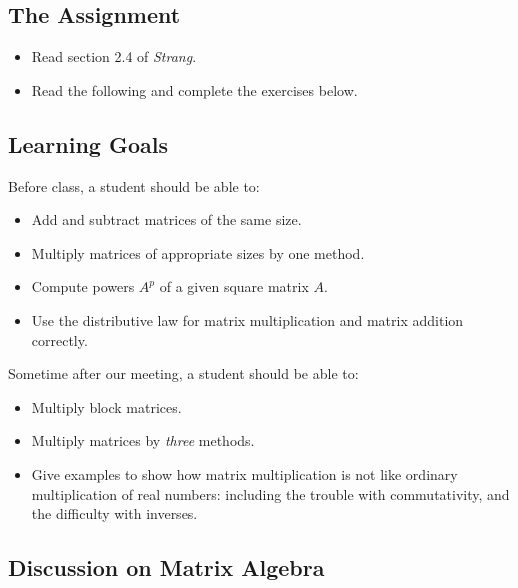 \documentclass[10pt,]{book}
\theoremstyle{plain}
\numberwithin{equation}{section}
\begin{document}
\subsection[The Assignment]{The Assignment}\label{subsection-36}
\begin{itemize}
\item{}Read section 2.4 of \emph{Strang}.\item{}Read the following and complete the exercises below.\end{itemize}
\typeout{************************************************}
\typeout{************************************************}
\subsection[Learning Goals]{Learning Goals}\label{subsection-37}

      Before class, a student should be able to:
\begin{itemize}
\item{}Add and subtract matrices of the same size.\item{}Multiply matrices of appropriate sizes by one method.\item{}Compute powers \(A^p\) of a given square matrix \(A\).\item{}Use the distributive law for matrix multiplication and matrix addition correctly.\end{itemize}
\par

      Sometime after our meeting, a student should be able to:
\begin{itemize}
\item{}Multiply block matrices.\item{}Multiply matrices by \emph{three} methods.\item{}Give examples to show how matrix multiplication is not like
        ordinary multiplication of real numbers: including the trouble
        with commutativity, and the difficulty with inverses.
      \end{itemize}
\typeout{************************************************}
\typeout{************************************************}
\subsection[Discussion on Matrix Algebra]{Discussion on Matrix Algebra}\label{subsection-38}
\end{document}
